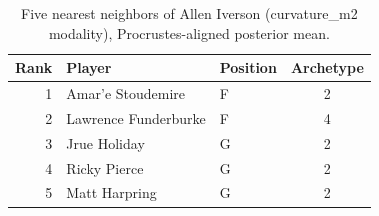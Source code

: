 \begin{table}[htbp]
  \centering\small
  \begin{tabular}{rllc}
    \toprule
    Rank & Player & Position & Archetype \\
    \midrule
    1 & Amar'e Stoudemire & F & 2 \\
    2 & Lawrence Funderburke & F & 4 \\
    3 & Jrue Holiday & G & 2 \\
    4 & Ricky Pierce & G & 2 \\
    5 & Matt Harpring & G & 2 \\
    \bottomrule
  \end{tabular}
  \caption{Five nearest neighbors of Allen Iverson (curvature_m2 modality), Procrustes-aligned posterior mean.}
  \label{tab:Allen_Iverson_neighbors_curvature_m2}
\end{table}

